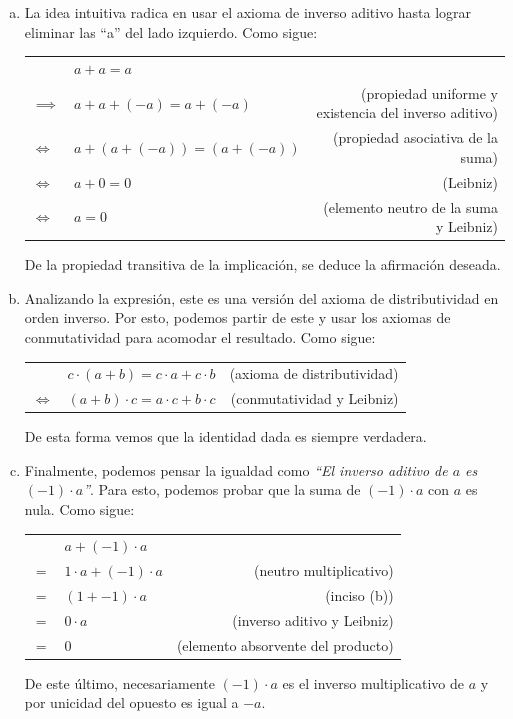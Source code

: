 \begin{enumerate}[(a)]
    \item La idea intuitiva radica en usar el axioma de inverso aditivo hasta lograr eliminar las ``a'' del lado izquierdo. Como sigue: \\
        \begin{tabular}{|l l r}
             & $a + a = a$ & \\
            $\implies$ & $a + a + (-a) = a + (-a)$ & (propiedad uniforme y existencia del inverso aditivo) \\
            $\iff$ & $a + (a + (-a)) = (a + (-a))$ & (propiedad asociativa de la suma) \\
            $\iff$ & $a + 0 = 0$ & (Leibniz) \\
            $\iff$ & $a = 0$ & (elemento neutro de la suma y Leibniz) \\
        \end{tabular}

        De la propiedad transitiva de la implicación, se deduce la afirmación deseada.

    \item Analizando la expresión, este es una versión del axioma de distributividad en orden inverso.
          Por esto, podemos partir de este y usar los axiomas de conmutatividad para acomodar el resultado.
          Como sigue: \\
          \begin{tabular}{|l l r}
             & $c \cdot (a + b) = c \cdot a + c \cdot b$ & (axioma de distributividad) \\
             $\iff$ & $(a + b) \cdot c = a \cdot c + b \cdot c$ & (conmutatividad y Leibniz) \\
          \end{tabular}

          De esta forma vemos que la identidad dada es siempre verdadera.

    \item Finalmente, podemos pensar la igualdad como \textit{``El inverso aditivo de $a$ es $(-1)\cdot a$''}.
          Para esto, podemos probar que la suma de $(-1) \cdot a$ con $a$ es nula. Como sigue: \\
          \begin{tabular}{|l l r}
             & $a + (-1) \cdot a$ & \\
             $=$ & $1 \cdot a + (-1) \cdot a$ & (neutro multiplicativo) \\
             $=$ & $(1 + -1) \cdot a$ & (inciso (b)) \\
             $=$ & $0 \cdot a$ & (inverso aditivo y Leibniz) \\
             $=$ & $0$ & (elemento absorvente del producto) \\
          \end{tabular}

          De este último, necesariamente $(-1) \cdot a$ es el inverso multiplicativo de $a$ y por unicidad del opuesto es igual a $-a$.
\end{enumerate}
